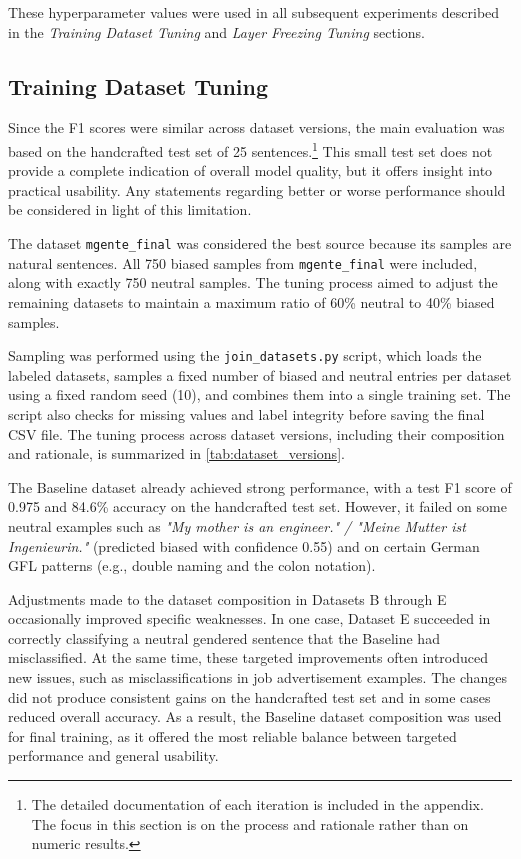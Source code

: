     These hyperparameter values were used in all subsequent experiments described in the \textit{Training Dataset Tuning} and \textit{Layer Freezing Tuning} sections.

\subsection{Training Dataset Tuning} \label{subsection:training_dataset_tuning}
    Since the F1 scores were similar across dataset versions, the main evaluation was based on the handcrafted test set of 25 sentences.\footnote{The detailed documentation of each iteration is included in the appendix. The focus in this section is on the process and rationale rather than on numeric results.} This small test set does not provide a complete indication of overall model quality, but it offers insight into practical usability. Any statements regarding better or worse performance should be considered in light of this limitation.

    The dataset \texttt{mgente\_final} was considered the best source because its samples are natural sentences. All 750 biased samples from \texttt{mgente\_final} were included, along with exactly 750 neutral samples. The tuning process aimed to adjust the remaining datasets to maintain a maximum ratio of 60\% neutral to 40\% biased samples.

    Sampling was performed using the \texttt{join\_datasets.py} script, which loads the labeled datasets, samples a fixed number of biased and neutral entries per dataset using a fixed random seed (10), and combines them into a single training set. The script also checks for missing values and label integrity before saving the final CSV file. The tuning process across dataset versions, including their composition and rationale, is summarized in \autoref{tab:dataset_versions}.

    The Baseline dataset already achieved strong performance, with a test F1 score of 0.975 and 84.6\% accuracy on the handcrafted test set. However, it failed on some neutral examples such as \textit{"My mother is an engineer." / "Meine Mutter ist Ingenieurin."} (predicted biased with confidence 0.55) and on certain German GFL patterns (e.g., double naming and the colon notation).

    Adjustments made to the dataset composition in Datasets B through E occasionally improved specific weaknesses. In one case, Dataset E succeeded in correctly classifying a neutral gendered sentence that the Baseline had misclassified. At the same time, these targeted improvements often introduced new issues, such as misclassifications in job advertisement examples. The changes did not produce consistent gains on the handcrafted test set and in some cases reduced overall accuracy. As a result, the Baseline dataset composition was used for final training, as it offered the most reliable balance between targeted performance and general usability.


